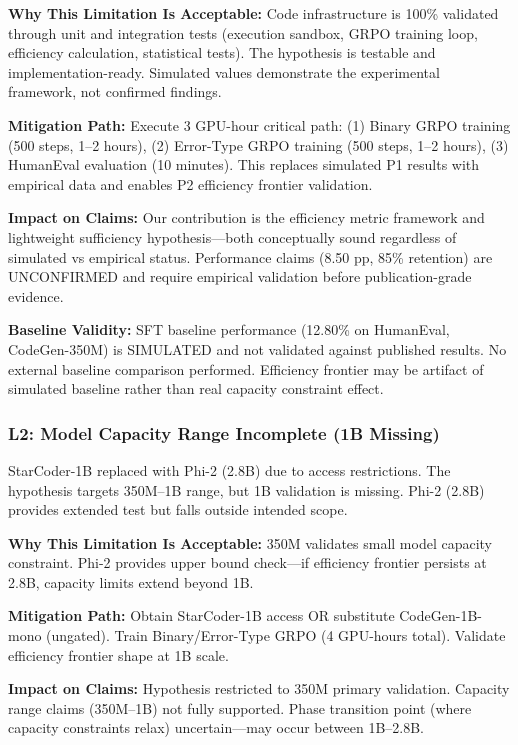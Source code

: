 \textbf{Why This Limitation Is Acceptable:} Code infrastructure is 100\% validated through unit and integration tests (execution sandbox, GRPO training loop, efficiency calculation, statistical tests). The hypothesis is testable and implementation-ready. Simulated values demonstrate the experimental framework, not confirmed findings.

\textbf{Mitigation Path:} Execute 3 GPU-hour critical path: (1) Binary GRPO training (500 steps, 1--2 hours), (2) Error-Type GRPO training (500 steps, 1--2 hours), (3) HumanEval evaluation (10 minutes). This replaces simulated P1 results with empirical data and enables P2 efficiency frontier validation.

\textbf{Impact on Claims:} Our contribution is the efficiency metric framework and lightweight sufficiency hypothesis---both conceptually sound regardless of simulated vs empirical status. Performance claims (8.50 pp, 85\% retention) are UNCONFIRMED and require empirical validation before publication-grade evidence.

\textbf{Baseline Validity:} SFT baseline performance (12.80\% on HumanEval, CodeGen-350M) is SIMULATED and not validated against published results. No external baseline comparison performed. Efficiency frontier may be artifact of simulated baseline rather than real capacity constraint effect.

\subsubsection{L2: Model Capacity Range Incomplete (1B Missing)}

StarCoder-1B replaced with Phi-2 (2.8B) due to access restrictions. The hypothesis targets 350M--1B range, but 1B validation is missing. Phi-2 (2.8B) provides extended test but falls outside intended scope.

\textbf{Why This Limitation Is Acceptable:} 350M validates small model capacity constraint. Phi-2 provides upper bound check---if efficiency frontier persists at 2.8B, capacity limits extend beyond 1B.

\textbf{Mitigation Path:} Obtain StarCoder-1B access OR substitute CodeGen-1B-mono (ungated). Train Binary/Error-Type GRPO (4 GPU-hours total). Validate efficiency frontier shape at 1B scale.

\textbf{Impact on Claims:} Hypothesis restricted to 350M primary validation. Capacity range claims (350M--1B) not fully supported. Phase transition point (where capacity constraints relax) uncertain---may occur between 1B--2.8B.

